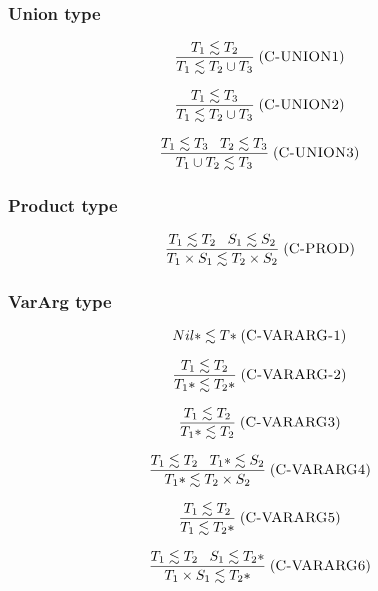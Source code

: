 \documentclass{beamer}
\newcommand{\mylabel}[1]{\; (\textsc{#1})}
\begin{document}
\begin{frame}
\frametitle{Union type}
\[
\frac{T_{1} \lesssim T_{2}}
     {T_{1} \lesssim T_{2} \cup T_{3}}
\mylabel{C-UNION1}
\]

\[
\frac{T_{1} \lesssim T_{3}}
     {T_{1} \lesssim T_{2} \cup T_{3}}
\mylabel{C-UNION2}
\]

\[
\frac{T_{1} \lesssim T_{3} \;\;\; T_{2} \lesssim T_{3}}
     {T_{1} \cup T_{2} \lesssim T_{3}}
\mylabel{C-UNION3}
\]
\end{frame}

\begin{frame}
\frametitle{Product type}
\[
\frac{T_{1} \lesssim T_{2} \;\;\; S_{1} \lesssim S_{2}}
     {T_{1} \times S_{1} \lesssim T_{2} \times S_{2}}
\mylabel{C-PROD}
\]
\end{frame}

\begin{frame}
\frametitle{VarArg type}
\[
{Nil*} \lesssim {T*}
\mylabel{C-VARARG-1}
\]

\[
\frac{T_{1} \lesssim T_{2}}
     {{T_{1}*} \lesssim {T_{2}*}}
\mylabel{C-VARARG-2}
\]

\[
\frac{T_{1} \lesssim T_{2}}
     {{T_{1}*} \lesssim T_{2}}
\mylabel{C-VARARG3}
\]

\[
\frac{T_{1} \lesssim T_{2} \;\;\;
      {T_{1}*} \lesssim S_{2}}
     {{T_{1}*} \lesssim T_{2} \times S_{2}}
\mylabel{C-VARARG4}
\]

\[
\frac{T_{1} \lesssim T_{2}}
     {T_{1} \lesssim {T_{2}*}}
\mylabel{C-VARARG5}
\]

\[
\frac{T_{1} \lesssim T_{2} \;\;\;
      S_{1} \lesssim {T_{2}*}}
     {T_{1} \times S_{1} \lesssim {T_{2}*}}
\mylabel{C-VARARG6}
\]
\end{frame}
\end{document}
